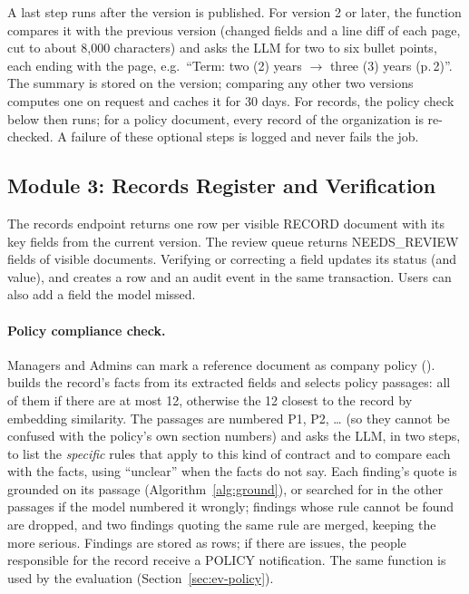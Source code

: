 A last step runs after the version is published. For version 2 or later, the function
 compares it with the previous version (changed fields and a line diff of each page, cut to about 8,000
characters) and asks the LLM for two to six bullet points, each ending with the page, e.g.\ ``Term: two (2)
years $\rightarrow$ three (3) years (p.\,2)''. The summary is stored on the version; comparing any other two
versions computes one on request and caches it for 30 days. For records, the policy check below then runs;
for a policy document, every record of the organization is re-checked. A failure of these optional steps is
logged and never fails the job.

\subsection{Module 3: Records Register and Verification}
The records endpoint returns one row per visible RECORD document with its key fields from the current
version. The review queue returns NEEDS\_REVIEW fields of visible documents. Verifying or correcting a
field updates its status (and value), and creates a  row and an audit event in the same
transaction. Users can also add a field the model missed.

\paragraph*{Policy compliance check.} Managers and Admins can mark a reference document as company policy
().  builds the record's facts from its
extracted fields and selects policy passages: all of them if there are at most 12, otherwise the 12 closest
to the record by embedding similarity. The passages are numbered P1, P2, \dots{} (so they cannot be confused
with the policy's own section numbers) and  asks the LLM, in two steps, to list the
\emph{specific} rules that apply to this kind of contract and to compare each with the facts, using
``unclear'' when the facts do not say. Each finding's quote is grounded on its passage
(Algorithm~\ref{alg:ground}), or searched for in the other passages if the model numbered it wrongly;
findings whose rule cannot be found are dropped, and two findings quoting the same rule are merged, keeping
the more serious. Findings are stored as  rows; if there are issues, the people
responsible for the record receive a POLICY notification. The same  function is used by the
evaluation (Section~\ref{sec:ev-policy}).

